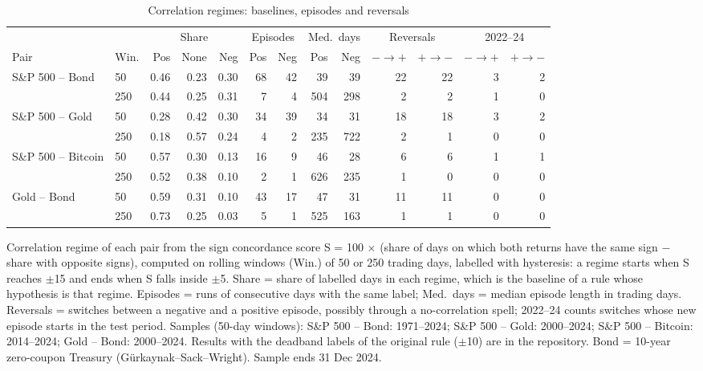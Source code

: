 \begin{table}[t]
\centering
\scriptsize
\setlength{\tabcolsep}{2.8pt}
\caption{Correlation regimes: baselines, episodes and reversals}
\label{tab:regimes}
\begin{tabular}{llrrrrrrrrrrr}
\toprule
 & & \multicolumn{3}{c}{Share} & \multicolumn{2}{c}{Episodes} & \multicolumn{2}{c}{Med.\ days} & \multicolumn{2}{c}{Reversals} & \multicolumn{2}{c}{2022--24} \\
\cmidrule(lr){3-5}\cmidrule(lr){6-7}\cmidrule(lr){8-9}\cmidrule(lr){10-11}\cmidrule(lr){12-13}
Pair & Win. & Pos & None & Neg & Pos & Neg & Pos & Neg & ${-}{\to}{+}$ & ${+}{\to}{-}$ & ${-}{\to}{+}$ & ${+}{\to}{-}$ \\
\midrule
S\&P 500 -- Bond & 50 & 0.46 & 0.23 & 0.30 & 68 & 42 & 39 & 39 & 22 & 22 & 3 & 2 \\
 & 250 & 0.44 & 0.25 & 0.31 & 7 & 4 & 504 & 298 & 2 & 2 & 1 & 0 \\
S\&P 500 -- Gold & 50 & 0.28 & 0.42 & 0.30 & 34 & 39 & 34 & 31 & 18 & 18 & 3 & 2 \\
 & 250 & 0.18 & 0.57 & 0.24 & 4 & 2 & 235 & 722 & 2 & 1 & 0 & 0 \\
S\&P 500 -- Bitcoin & 50 & 0.57 & 0.30 & 0.13 & 16 & 9 & 46 & 28 & 6 & 6 & 1 & 1 \\
 & 250 & 0.52 & 0.38 & 0.10 & 2 & 1 & 626 & 235 & 1 & 0 & 0 & 0 \\
Gold -- Bond & 50 & 0.59 & 0.31 & 0.10 & 43 & 17 & 47 & 31 & 11 & 11 & 0 & 0 \\
 & 250 & 0.73 & 0.25 & 0.03 & 5 & 1 & 525 & 163 & 1 & 1 & 0 & 0 \\
\bottomrule
\end{tabular}
\par\smallskip
\parbox{\linewidth}{\footnotesize Correlation regime of each pair from the sign concordance score S = 100 $\times$ (share of days on which both returns have the same sign $-$ share with opposite signs), computed on rolling windows (Win.) of 50 or 250 trading days, labelled with hysteresis: a regime starts when S reaches $\pm$15 and ends when S falls inside $\pm$5. Share = share of labelled days in each regime, which is the baseline of a rule whose hypothesis is that regime. Episodes = runs of consecutive days with the same label; Med.\ days = median episode length in trading days. Reversals = switches between a negative and a positive episode, possibly through a no-correlation spell; 2022--24 counts switches whose new episode starts in the test period. Samples (50-day windows): S\&P 500 -- Bond: 1971--2024; S\&P 500 -- Gold: 2000--2024; S\&P 500 -- Bitcoin: 2014--2024; Gold -- Bond: 2000--2024. Results with the deadband labels of the original rule ($\pm$10) are in the repository. Bond = 10-year zero-coupon Treasury (G\"urkaynak--Sack--Wright). Sample ends 31 Dec 2024.}
\end{table}
